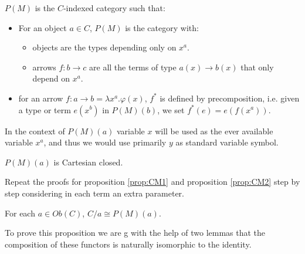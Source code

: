 \begin{definition} $P(M)$ is the $C$-indexed category such that:
  \begin{itemize}
  \item For an object $a\in C$, $P(M)$ is the category with:
    \begin{itemize}
    \item objects are the types depending only on $x^a$.
    \item arrows $f: b\to c$ are all the terms of type $a(x)\to b(x)$ that only depend on $x^a$.
    \end{itemize}
  \item for an arrow $f:a\to b = \lambda x^a.\varphi(x)$, $f^*$ is defined by precomposition, i.e. given a type or term $e(x^b)$ in $P(M)(b)$, we set $f^*(e) = e(f(x^a))$.  
  \end{itemize}
\end{definition}

\begin{remark}
  In the context of $P(M)(a)$ variable $x$ will be used as the ever available variable $x^a$, and thus we would use primarily $y$ as standard variable symbol.
\end{remark}
\begin{proposition}
  $P(M)(a)$ is Cartesian closed.
\end{proposition}
\begin{sproof}
  Repeat the proofs for proposition \ref{prop:CM1} and proposition \ref{prop:CM2} step by step considering in each term an extra parameter.
\end{sproof}


\begin{proposition}\label{lemma:hyperdoc}
  For each $a\in Ob(C)$, $C/a\cong P(M)(a)$.
\end{proposition}

To prove this proposition we are g with the help of two lemmas that the composition of these functors is naturally isomorphic to the identity.

